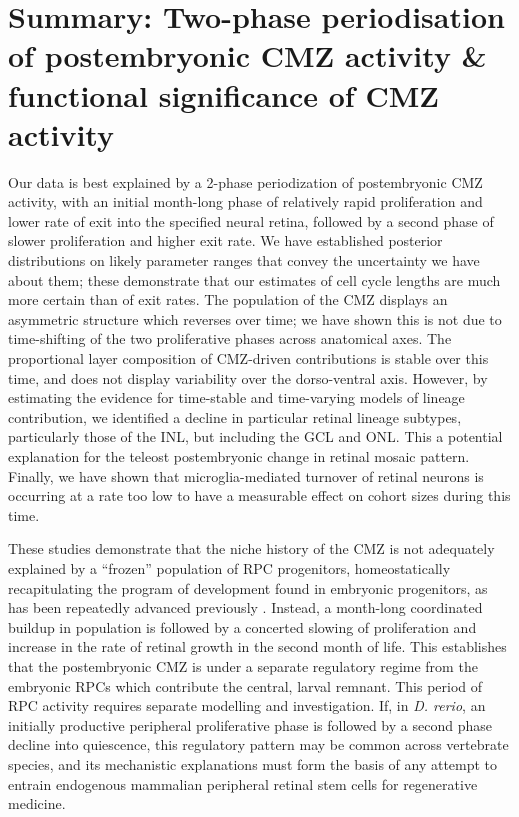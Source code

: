 \section{Summary: Two-phase periodisation of postembryonic CMZ activity \& functional significance of CMZ activity}
Our data is best explained by a 2-phase periodization of postembryonic CMZ activity, with an initial month-long phase of relatively rapid proliferation and lower rate of exit into the specified neural retina, followed by a second phase of slower proliferation and higher exit rate. We have established posterior distributions on likely parameter ranges that convey the uncertainty we have about them; these demonstrate that our estimates of cell cycle lengths are much more certain than of exit rates.  The population of the CMZ displays an asymmetric structure which reverses over time; we have shown this is not due to time-shifting of the two proliferative phases across anatomical axes. The proportional layer composition of CMZ-driven contributions is stable over this time, and does not display variability over the dorso-ventral axis. However, by estimating the evidence for time-stable and time-varying models of lineage contribution, we identified a decline in particular retinal lineage subtypes, particularly those of the INL, but including the GCL and ONL. This a potential explanation for the teleost postembryonic change in retinal mosaic pattern. Finally, we have shown that microglia-mediated turnover of retinal neurons is occurring at a rate too low to have a measurable effect on cohort sizes during this time.

These studies demonstrate that the niche history of the CMZ is not adequately explained by a ``frozen'' population of RPC progenitors, homeostatically recapitulating the program of development found in embryonic progenitors, as has been repeatedly advanced previously \cite{Harris1998,Wan2016}. Instead, a month-long coordinated buildup in population is followed by a concerted slowing of proliferation and increase in the rate of retinal growth in the second month of life. This establishes that the postembryonic CMZ is under a separate regulatory regime from the embryonic RPCs which contribute the central, larval remnant. This period of RPC activity requires separate modelling and investigation. If, in \textit{D. rerio}, an initially productive peripheral proliferative phase is followed by a second phase decline into quiescence, this regulatory pattern may be common across vertebrate species, and its mechanistic explanations must form the basis of any attempt to entrain endogenous mammalian peripheral retinal stem cells for regenerative medicine.

